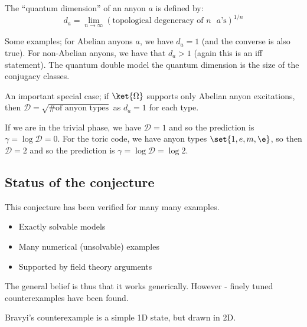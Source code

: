The ``quantum dimension'' of an anyon $a$ is defined by:
\begin{equation}
    d_a = \lim_{n\to\infty}\left(\text{topological degeneracy of $n$ $a$'s}\right)^{1/n}
\end{equation}

Some examples; for Abelian anyons $a$, we have $d_a = 1$ (and the converse is also true). For non-Abelian anyons, we have that $d_a > 1$ (again this is an iff statement). The quantum double model the quantum dimension is the size of the conjugacy classes. 

An important special case; if $\ket{\Omega}$ supports only Abelian anyon excitations, then $\mathcal{D} = \sqrt{\text{\# of anyon types}}$ as $d_a = 1$ for each type.

If we are in the trivial phase, we have $\mathcal{D} = 1$ and so the prediction is $\gamma = \log \mathcal{D} = 0$. For the toric code, we have anyon types $\set{1, e, m, \e}$, so then $\mathcal{D} = 2$ and so the prediction is $\gamma = \log \mathcal{D} = \log 2$.

\subsection{Status of the conjecture}
This conjecture has been verified for many many examples.
\begin{itemize}
    \item Exactly solvable models
    \item Many numerical (unsolvable) examples
    \item Supported by field theory arguments
\end{itemize}
The general belief is thus that it works generically. However - finely tuned counterexamples have been found.

Bravyi's counterexample is a simple 1D state, but drawn in 2D.

